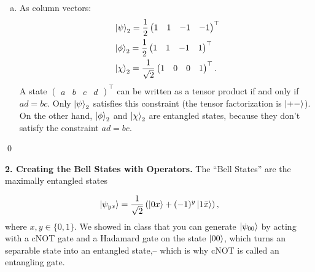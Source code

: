 \documentclass{book}
\theoremstyle{definition}
\newcommand{\f}[2]{\frac{#1}{#2}}
\newcommand{\lp}{\left(}
\newcommand{\rp}{\right)}
\begin{document}
\begin{enumerate}[(a)]
	
	\item As column vectors:
	\begin{align}
	&\ket{\psi}_2 = \f{1}{2} \begin{pmatrix}
	1 & 1 & -1 & -1
	\end{pmatrix}^\top\\
	&\ket{\phi}_2 = \f{1}{2}\begin{pmatrix}
	1 & 1 & -1 & 1
	\end{pmatrix}^\top\\
	&\ket{\chi}_2 = \f{1}{\sqrt{2}}\begin{pmatrix}
	1 & 0 & 0 & 1
	\end{pmatrix}^\top.
	\end{align}
	A state $\begin{pmatrix}
	a&b&c&d
	\end{pmatrix}^\top$ can be written as a tensor product if and only if $ad = bc$. Only $\ket{\psi}_2$ satisfies this constraint (the tensor factorization is $\ket{+-}$). On the other hand, $\ket{\phi}_2$ and $\ket{\chi}_2$ are entangled states, because they don't satisfy the constraint $ad = bc$. 
	
\end{enumerate}\qed


\newpage

























\noindent \textbf{2. Creating the Bell States with Operators.} The ``Bell States'' are the maximally entangled states

\begin{align}
\ket{\psi_{yx}} = \f{1}{\sqrt{2}}\lp \ket{0x} + (-1)^y\ket{1\bar{x}} \rp,
\end{align}
where $x,y \in \{0,1\}$. We showed in class that you can generate $\ket{\psi_{00}}$ by acting with a cNOT gate and a Hadamard gate on the state $\ket{00}$, which turns an separable state into an entangled state,– which is why cNOT is called an entangling gate.\\
\end{document}
